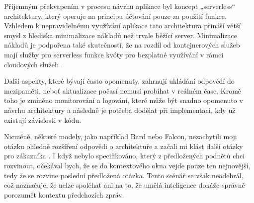 \documentclass[FM,DP]{tulthesis}
\begin{document}
		Příjemným překvapením v procesu návrhu aplikace byl koncept „serverless“ architektury, který operuje na principu účtování pouze za použití funkce. Vzhledem k nepravidelnému využívání aplikace tato architektura přináší větší smysl z hlediska minimalizace nákladů než trvale běžící server. Minimalizace nákladů je podpořena také skutečností, že na rozdíl od kontejnerových služeb mají služby pro serverless funkce kvóty pro bezplatné využívání v rámci cloudových služeb \cite{webapp_basics} \cite{bard_analyza} \cite{chatgpt_analyza} \cite{codellama_analyza} \cite{gitCopilot_analyza} \cite{claude_analyza} \cite{bingCopilot_analyza}. 
		
		Další aspekty, které bývají často opomenuty, zahrnují ukládání odpovědí do mezipaměti, neboť aktualizace počasí nemusí probíhat v reálném čase. Kromě toho je zmíněno monitorování a logování, které může být snadno opomenuto v návrhu architektury a následně je potřeba dodělat při implementaci, kdy už existují závislosti v kódu.
		
		Nicméně, některé modely, jako například Bard nebo Falcon, nezachytili moji otázku ohledně rozšíření odpovědi o architektuře a začali mi klást další otázky pro zákazníka \cite{bard_analyza} \cite{falcon_analyza}. I když nebylo specifikováno, který z předložených podnětů chci rozvinout, očekával bych, že se do kontextového okna vejde pouze ten nejnovější, tedy že se rozvine poslední předložená otázka. Tento scénář se však neodehrál, což naznačuje, že nelze spoléhat ani na to, že umělá inteligence dokáže správně porozumět kontextu předchozích zpráv.
		
\end{document}
